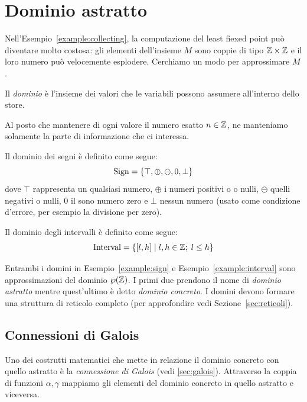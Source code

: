 \section{Dominio astratto}

Nell'Esempio~\ref{example:collecting}, la computazione del least fiexed point può diventare molto costosa: gli elementi dell'insieme $M$ sono coppie di tipo $\mathbb{Z} \times \mathbb{Z}$ e il loro numero può velocemente esplodere. Cerchiamo un modo per approssimare $M$. 

\begin{definition}[Dominio]
Il \emph{dominio} è l'insieme dei valori che le variabili possono assumere all'interno dello store. 
\end{definition}

Al posto che mantenere di ogni valore il numero esatto $n \in \mathbb{Z}$, ne manteniamo solamente la parte di informazione che ci interessa.

\begin{example}\label{example:sign}
Il dominio dei segni è definito come segue:
\[ \mathrm{Sign} = \{ \top, \oplus, \ominus, 0, \bot \} \]
dove $\top$ rappresenta un qualsiasi numero, $\oplus$ i numeri positivi o o nulli, $\ominus$ quelli negativi o nulli, $0$ il sono numero zero e $\bot$ nessun numero (usato come condizione d'errore, per esempio la divisione per zero). 
\end{example}

\begin{example}\label{example:interval}
Il dominio degli intervalli è definito come segue:
\[ \mathrm{Interval} = \{ [l,h] \mid l,h \in \mathbb{Z}; \; l \le h \} \]
\end{example}

Entrambi i domini in Esempio~\ref{example:sign} e Esempio~\ref{example:interval} sono approssimazioni del dominio $\wp(\mathbb{Z})$. I primi due prendono il nome di \emph{dominio astratto} mentre quest'ultimo è detto \emph{dominio concreto}. I domini devono formare una struttura di reticolo completo (per approfondire vedi Sezione~\ref{sec:reticoli}).

\subsection{Connessioni di Galois}\label{sec:galois-c}

Uno dei costrutti matematici che mette in relazione il dominio concreto con quello astratto è la \emph{connessione di Galois} (vedi \ref{sec:galois}). Attraverso la coppia di funzioni $\alpha, \gamma$ mappiamo gli elementi del dominio concreto in quello astratto e viceversa. 

